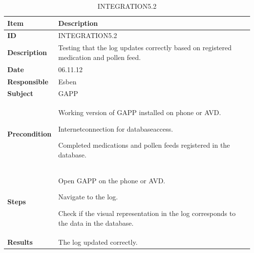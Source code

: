 \begin{table}
	\begin{center}
		\begin{tabular}{|p{3.0cm}|p{14.0cm}|}
			\hline
			\bf{Item} & \bf{Description}\\
			\hline
			\bf{ID} & INTEGRATION5.2\\
			\bf{Description} & Testing that the log updates correctly based on registered medication and pollen feed.\\
			\bf{Date} & 06.11.12\\
			\bf{Responsible} & Esben\\
			\bf{Subject} & GAPP\\
			\bf{Precondition} & 
				\begin{tabulitem}
					\item Working version of GAPP installed on phone or AVD.
					\item Internetconnection for databaseaccess.
					\item Completed medications and pollen feeds registered in the database.
				\end{tabulitem}\\
			\bf{Steps} &
			\begin{tabulenum}
				\item Open GAPP on the phone or AVD.
				\item Navigate to the log.
				\item Check if the visual representation in the log corresponds to the data in the database.
			\end{tabulenum}\\
			\hline
			\bf{Results} & The log updated correctly.\\
			\hline
		\end{tabular}
	\end{center}
	\caption{INTEGRATION5.2}
	\label{tab:integration5.2}
\end{table}

